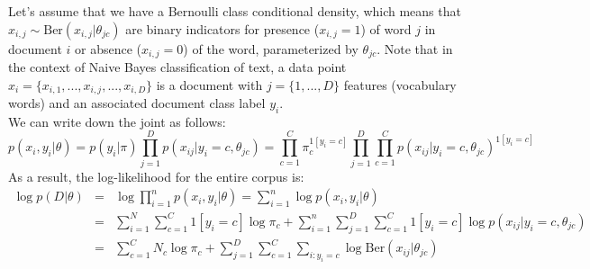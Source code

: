Let's assume that we have a Bernoulli class conditional density, which means that $x_{i,j} \sim \mathrm{Ber}(x_{i,j}|\theta_{jc})$ are binary indicators for presence ($x_{i,j} = 1$) of word $j$ in document $i$ or absence ($x_{i,j} = 0$) of the word, parameterized by $\theta_{jc}$. Note that in the context of Naive Bayes classification of text, a data point $x_i = \{x_{i,1},...,x_{i,j},...,x_{i,D}\}$ is a document with $j=\{1,...,D\}$ features (vocabulary words) and an associated document class label $y_i$.\\

We can write down the joint as follows:
\begin{equation}
    p(x_i, y_i|\theta) = p(y_i|\pi) \prod_{j=1}^{D}p(x_{ij}|y_i=c,\theta_{jc}) = \prod_{c=1}^{C}\pi_{c}^{1[y_i = c]} \prod_{j=1}^{D}\prod_{c=1}^{C}p(x_{ij}|y_i=c,\theta_{jc})^{1[y_i = c]}
\end{equation}
As a result, the log-likelihood for the entire corpus is:
\begin{eqnarray}
    \log p(D|\theta) &=& \log \prod_{i=1}^{n} p(x_i, y_i|\theta) = \sum_{i=1}^{n} \log p(x_i, y_i|\theta) \nonumber \\
&=& \sum_{i=1}^{N}\sum_{c=1}^{C}1[y_i = c]\log \pi_c + \sum_{i=1}^{n}\sum_{j=1}^{D}\sum_{c=1}^{C}1[y_i = c]\log p(x_{ij}|y_i = c, \theta_{jc}) \nonumber \\
&=& \sum_{c=1}^{C}N_c \log \pi_c + \sum_{j=1}^{D} \sum_{c=1}^{C}\sum_{i:y_i = c} \log \mathrm{Ber}(x_{ij}|\theta_{jc}) 
\end{eqnarray}

